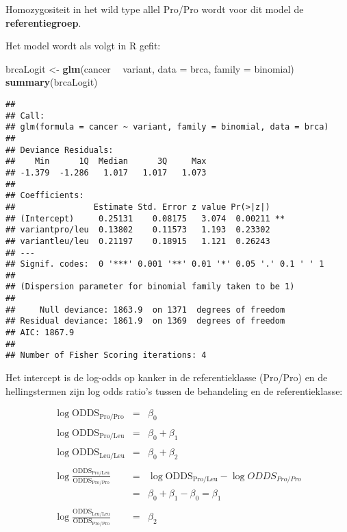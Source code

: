 \documentclass[12pt,dutch,coursenotes]{book}
\newenvironment{Shaded}{\begin{snugshade}}{\end{snugshade}}
\newcommand{\KeywordTok}[1]{\textcolor[rgb]{0.13,0.29,0.53}{\textbf{#1}}}
\newcommand{\DataTypeTok}[1]{\textcolor[rgb]{0.13,0.29,0.53}{#1}}
\newcommand{\StringTok}[1]{\textcolor[rgb]{0.31,0.60,0.02}{#1}}
\newcommand{\OperatorTok}[1]{\textcolor[rgb]{0.81,0.36,0.00}{\textbf{#1}}}
\newcommand{\NormalTok}[1]{#1}
\theoremstyle{definition}
\theoremstyle{definition}
\theoremstyle{definition}
\theoremstyle{remark}
\begin{document}
Homozygositeit in het wild type allel Pro/Pro wordt voor dit model de
\textbf{referentiegroep}.

Het model wordt als volgt in R gefit:

\begin{Shaded}
\begin{Highlighting}[]
\NormalTok{brcaLogit <-}\StringTok{ }\KeywordTok{glm}\NormalTok{(cancer }\OperatorTok{~}\StringTok{ }\NormalTok{variant, }\DataTypeTok{data =}\NormalTok{ brca, }\DataTypeTok{family =}\NormalTok{ binomial)}
\KeywordTok{summary}\NormalTok{(brcaLogit)}
\end{Highlighting}
\end{Shaded}

\begin{verbatim}
## 
## Call:
## glm(formula = cancer ~ variant, family = binomial, data = brca)
## 
## Deviance Residuals: 
##    Min      1Q  Median      3Q     Max  
## -1.379  -1.286   1.017   1.017   1.073  
## 
## Coefficients:
##                Estimate Std. Error z value Pr(>|z|)   
## (Intercept)     0.25131    0.08175   3.074  0.00211 **
## variantpro/leu  0.13802    0.11573   1.193  0.23302   
## variantleu/leu  0.21197    0.18915   1.121  0.26243   
## ---
## Signif. codes:  0 '***' 0.001 '**' 0.01 '*' 0.05 '.' 0.1 ' ' 1
## 
## (Dispersion parameter for binomial family taken to be 1)
## 
##     Null deviance: 1863.9  on 1371  degrees of freedom
## Residual deviance: 1861.9  on 1369  degrees of freedom
## AIC: 1867.9
## 
## Number of Fisher Scoring iterations: 4
\end{verbatim}

Het intercept is de log-odds op kanker in de referentieklasse (Pro/Pro)
en de hellingstermen zijn log odds ratio's tussen de behandeling en de
referentieklasse:

\begin{eqnarray*}
\log \text{ODDS}_\text{Pro/Pro}&=&\beta_0\\\\
\log \text{ODDS}_\text{Pro/Leu}&=&\beta_0+\beta_1\\\\
\log \text{ODDS}_\text{Leu/Leu}&=&\beta_0+\beta_2\\\\
\log  \frac{\text{ODDS}_\text{Pro/Leu}}{\text{ODDS}_\text{Pro/Pro}}&=&\log \text{ODDS}_\text{Pro/Leu}-\log ODDS_{Pro/Pro}\\
&=&\beta_0+\beta_1-\beta_0=\beta_1\\\\
\log  \frac{\text{ODDS}_\text{Leu/Leu}}{\text{ODDS}_\text{Pro/Pro}}&=&\beta_2
\end{eqnarray*}
\end{document}
